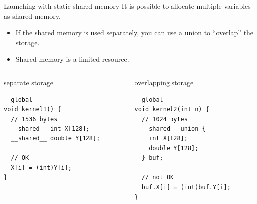 \documentclass[aspectratio=43]{beamer}
\begin{document}
\begin{frame}[fragile]{Launching with static shared memory}
    It is possible to allocate multiple variables as shared memory.
    \begin{itemize}
        \item   If the shared memory is used separately, you can use a union to ``overlap'' the storage.
        \item   Shared memory is a limited resource.
    \end{itemize}

    \begin{columns}[T]
        \begin{column}{0.48\textwidth}
            \begin{code}{separate storage}
                \begin{lstlisting}[style=boxcudatiny]
__global__
void kernel1() {
  // 1536 bytes
  __shared__ int X[128];
  __shared__ double Y[128];

  // OK
  X[i] = (int)Y[i];
}
                 \end{lstlisting}
            \end{code}
        \end{column}

        \begin{column}{0.48\textwidth}
            \begin{code}{overlapping storage}
                \begin{lstlisting}[style=boxcudatiny]
__global__
void kernel2(int n) {
  // 1024 bytes
  __shared__ union {
    int X[128];
    double Y[128];
  } buf;

  // not OK
  buf.X[i] = (int)buf.Y[i];
}
                \end{lstlisting}
            \end{code}
        \end{column}
    \end{columns}
\end{frame}
\end{document}
